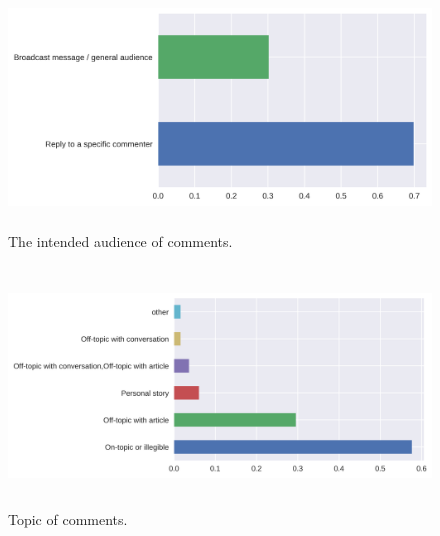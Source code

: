 \begin{figure}[h]%
\centering
\label{fig9}%
\includegraphics[height=2.5in]{img/audience_expert.png}%
\caption{The intended audience of comments.}%
\end{figure}
\begin{figure}[h]%
\label{fig8}%
\centering
\includegraphics[height=2.5in]{img/pmf_topic_expert.png}
\caption{Topic of comments.}%
\end{figure}

\clearpage